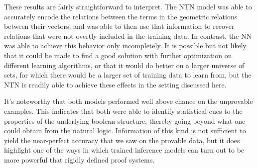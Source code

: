 \documentclass[letterpaper]{article}
\begin{document}




These results are fairly straightforward to interpret. The NTN model
was able to accurately encode the relations between the terms in the
geometric relations between their vectors, and was able to then use
that information to recover relations that were not overtly included
in the training data. In contrast, the NN was able to achieve this
behavior only incompletely. It is possible but not likely that it
could be made to find a good solution with further optimization on
different learning algorithms, or that it would do better on a larger
universe of sets, for which there would be a larger set of training
data to learn from, but the NTN is readily able to achieve these
effects in the setting discussed here. 

It's noteworthy that both models performed well above chance on the
unprovable examples. This indicates that both were able to identify
statistical cues to the properties of the underlying boolean
structure, thereby going beyond what one could obtain from the natural
logic. Information of this kind is not sufficient to yield the
near-perfect accuracy that we saw on the provable data, but it does
highlight one of the ways in which trained inference models can turn
out to be more powerful that rigidly defined proof systems.
\end{document}
